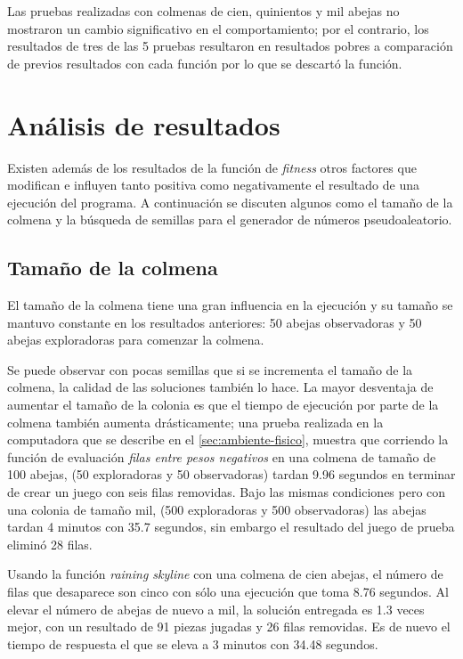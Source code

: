 Las pruebas realizadas con colmenas de cien, quinientos y mil abejas no mostraron un cambio significativo 
en el comportamiento; por el contrario, los resultados de tres de las 5 pruebas 
resultaron en resultados pobres a comparación de previos resultados con cada 
función por lo que se descartó la función.

\section{Análisis de resultados}

Existen además de los resultados de la función de \textit{fitness} otros 
factores que modifican e influyen tanto positiva como negativamente el resultado 
de una ejecución del programa. A continuación se discuten algunos como 
el tamaño de la colmena y la búsqueda de semillas para el generador de números pseudoaleatorio.

\subsection{Tamaño de la colmena}

El tamaño de la colmena tiene una gran influencia en la ejecución y su tamaño
se mantuvo constante en los resultados anteriores: 50 abejas observadoras y 
50 abejas exploradoras para comenzar la colmena.

 Se puede observar con pocas semillas que si se incrementa el tamaño de la colmena, la calidad 
de las soluciones también lo hace. La mayor desventaja de aumentar el tamaño de 
la colonia es que el tiempo de ejecución por parte de la colmena también aumenta drásticamente;
una prueba realizada en la computadora que se describe en el \cref{sec:ambiente-fisico}, 
muestra que corriendo la función de evaluación \textit{filas entre pesos negativos} en una colmena de 
tamaño de 100 abejas, (50 exploradoras y 50 observadoras) tardan 9.96 segundos en 
terminar de crear un juego con seis filas removidas. Bajo las mismas condiciones pero 
con una colonia de tamaño mil, (500 exploradoras y 500 observadoras) las abejas 
tardan 4 minutos con 35.7 segundos, sin embargo el resultado del juego de prueba 
eliminó 28 filas.

Usando la función \emph{raining skyline} con una colmena de cien abejas, el número de 
filas que desaparece son cinco con sólo una ejecución que toma 8.76 segundos. 
Al elevar el número de abejas de nuevo a mil, la solución entregada es 1.3 veces 
mejor, con un resultado de 91 piezas jugadas y 26 filas removidas. Es de nuevo el 
tiempo de respuesta el que se eleva a 3 minutos con 34.48 segundos.


